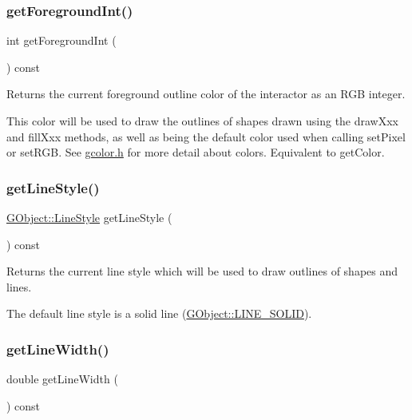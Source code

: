 \subsubsection{\texorpdfstring{get\+Foreground\+Int()}{getForegroundInt()}}
{\footnotesize\ttfamily int get\+Foreground\+Int (\begin{DoxyParamCaption}{ }\end{DoxyParamCaption}) const\hspace{0.3cm}{\ttfamily [virtual]}}



Returns the current foreground outline color of the interactor as an R\+GB integer. 

This color will be used to draw the outlines of shapes drawn using the draw\+Xxx and fill\+Xxx methods, as well as being the default color used when calling set\+Pixel or set\+R\+GB. See \mbox{\hyperlink{gcolor_8h_source}{gcolor.\+h}} for more detail about colors. Equivalent to get\+Color. \mbox{\label{classGDrawingSurface_aaf1f5ea8281e5e3486662878d26f0a13}} 
\subsubsection{\texorpdfstring{get\+Line\+Style()}{getLineStyle()}}
{\footnotesize\ttfamily \mbox{\hyperlink{classGObject_a86e0f5648542856159bb40775c854aa7}{G\+Object\+::\+Line\+Style}} get\+Line\+Style (\begin{DoxyParamCaption}{ }\end{DoxyParamCaption}) const\hspace{0.3cm}{\ttfamily [virtual]}}



Returns the current line style which will be used to draw outlines of shapes and lines. 

The default line style is a solid line (\mbox{\hyperlink{classGObject_a86e0f5648542856159bb40775c854aa7a700c78bc2cd76acaab26651bf7b4941f}{G\+Object\+::\+L\+I\+N\+E\+\_\+\+S\+O\+L\+ID}}). \mbox{\label{classGDrawingSurface_a85ff266dc3eb63d9f2d8e5a4487fd3c0}} 
\subsubsection{\texorpdfstring{get\+Line\+Width()}{getLineWidth()}}
{\footnotesize\ttfamily double get\+Line\+Width (\begin{DoxyParamCaption}{ }\end{DoxyParamCaption}) const\hspace{0.3cm}{\ttfamily [virtual]}}



